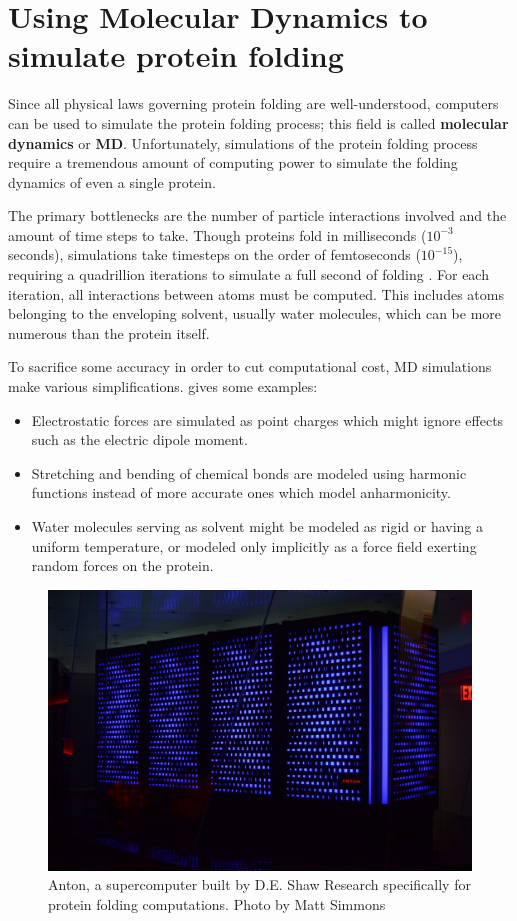 \documentclass{article}
\begin{document}
\section{Using Molecular Dynamics to simulate protein folding}
Since all physical laws governing protein folding are well-understood, computers can be used to simulate the protein folding process; this field is called \textbf{molecular dynamics} or \textbf{MD}. Unfortunately, simulations of the protein folding process require a tremendous amount of computing power to simulate the folding dynamics of even a single protein. 

The primary bottlenecks are the number of particle interactions involved and the amount of time steps to take. Though proteins fold in milliseconds ($10^{-3}$ seconds), simulations take timesteps on the order of femtoseconds ($10^{-15}$), requiring a quadrillion iterations to simulate a full second of folding \cite{md}. For each iteration, all interactions between atoms must be computed. This includes atoms belonging to the enveloping solvent, usually water molecules, which can be more numerous than the protein itself.

To sacrifice some accuracy in order to cut computational cost, MD simulations make various simplifications. \cite{md} gives some examples:

\begin{itemize}
    \item Electrostatic forces are simulated as point charges which might ignore effects such as the electric dipole moment.
    \item Stretching and bending of chemical bonds are modeled using harmonic functions instead of more accurate ones which model anharmonicity.
    \item Water molecules serving as solvent might be modeled as rigid or having a uniform temperature, or modeled only implicitly as a force field exerting random forces on the protein.
\end{itemize} 

\begin{figure}[ht]
  \includegraphics[width=\linewidth]{images/anton.jpg}
  \caption{Anton, a supercomputer built by D.E. Shaw Research specifically for protein folding computations. \cite{Anton} Photo by Matt Simmons}
  \label{fig:anton}
\end{figure}
\end{document}
